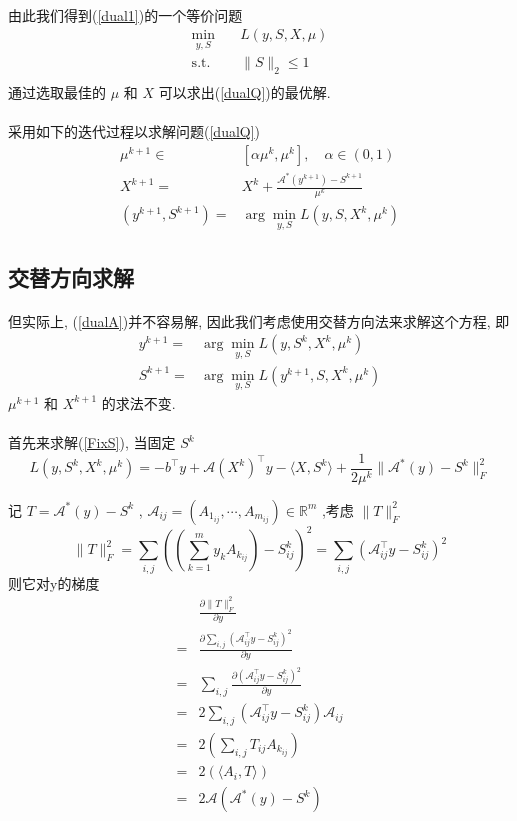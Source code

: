\documentclass[UTF8]{ctexart}
\newcommand{\equSplit}[1]{\begin{equation}\begin{split}#1\end{split}\end{equation}}
\newcommand{\equAlign}[1]{\begin{align}#1\end{align}}
\newcommand{\equ}[1]{\begin{equation}#1\end{equation}}
\newcommand{\Tst}{\text{s.t.}\quad}
\newcommand{\norm}[1]{\lVert#1\rVert}
\newcommand{\inprod}[1]{\langle#1\rangle}
\newcommand{\Real}[1]{\mathbb{R}^{#1}}
\newcommand{\Ma}{\mathcal{A}}
\newcommand{\partD}[2]{\frac{\partial#1}{\partial#2}}
\numberwithin{equation}{section}
\begin{document}
			\paragraph{}
				\quad 由此我们得到(\ref{dual1})的一个等价问题
				\equSplit{\label{dualQ}
					\min_{y,S} \quad & L(y, S, X, \mu)\\
					\Tst & \norm{S}_2 \le 1\\
				}
				通过选取最佳的 $\mu$ 和 $X$ 可以求出(\ref{dualQ})的最优解.
		
		
			\paragraph{}
				\quad 采用如下的迭代过程以求解问题(\ref{dualQ})
				\equSplit{\label{dualA}
						\mu^{k + 1}
					\in	& [\alpha \mu^k, \mu^k], \quad \alpha \in (0,1)\\
						X^{k + 1}
					=	& X^k + \frac{\Ma^*(y^{k + 1}) - S^{k + 1}}{\mu^k}\\
						(y^{k + 1}, S^{k + 1}) 
					=	& \arg \min_{y, S}L(y, S, X^k, \mu^k)
				}
		\subsection{交替方向求解}
			\paragraph{}
				\quad 但实际上, (\ref{dualA})并不容易解, 因此我们考虑使用交替方向法来求解这个方程, 即
				\equAlign{
						y^{k + 1}
					=	& \arg \min_{y, S}L(y, S^k, X^k, \mu^k) \label{FixS}\\
						S^{k + 1}
					=	& \arg \min_{y, S}L(y^{k + 1}, S, X^k, \mu^k) \label{FixY}
				}
				$\mu^{k + 1}$ 和 $X^{k + 1}$ 的求法不变.

			\paragraph{}
				\quad 首先来求解(\ref{FixS}), 当固定 $S^k$
				\equ{\label{LagFixS}
						L(y, S^k, X^k, \mu^k)
					=	-b^\top y + \Ma(X^k)^\top y - \inprod{X, S^k}+ \frac{1}{2\mu^k} \norm{\Ma^*(y) - S^k}^2_F
				}

				记 $T = \Ma^*(y) - S^k$ , $\Ma_{ij} = (A_{1_{ij}}, \cdots, A_{m_{ij}}) \in \Real{m}$ ,考虑 $\norm{T}^2_F$
				\[
						\norm{T}^2_F
					=	\sum_{i, j}((\sum^m_{k = 1} y_k A_{k_{ij}}) - S^k_{ij})^2
					=	\sum_{i, j}(\Ma_{ij}^\top y - S^k_{ij})^2
				\]
				则它对y的梯度
				\equ{
					\begin{aligned}
							& \partD{\norm{T}^2_F}{y}\\
						=	& \partD{\sum_{i, j}(\Ma_{ij}^\top y - S^k_{ij})^2}{y}\\
						=	& \sum_{i, j}\partD{(\Ma_{ij}^\top y - S^k_{ij})^2}{y} \\
						=	& 2\sum_{i, j}(\Ma_{ij}^\top y - S^k_{ij}) \Ma_{ij}\\
						=	& 2(\sum_{i, j}T_{ij} A_{k_{ij}})\\
						=	& 2(\inprod{A_i, T})\\
						=	& 2\Ma(\Ma^*(y) - S^k)
					\end{aligned}
				}
\end{document}
